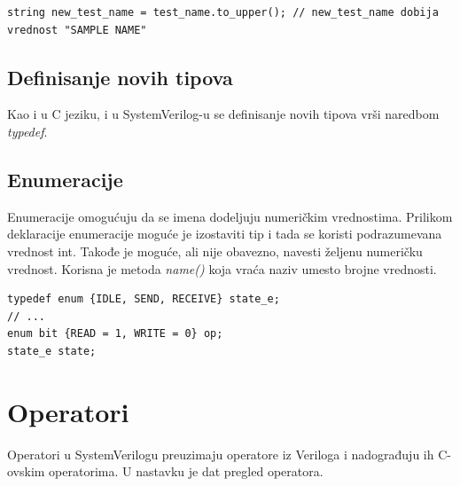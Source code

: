 \begin{lstlisting}
string new_test_name = test_name.to_upper(); // new_test_name dobija vrednost "SAMPLE NAME"
\end{lstlisting}


\subsection{Definisanje novih tipova}

Kao i u C jeziku, i u SystemVerilog-u se definisanje novih tipova vrši naredbom
\emph{typedef}.


\subsection{Enumeracije}

Enumeracije omogućuju da se imena dodeljuju numeričkim vrednostima. Prilikom
deklaracije enumeracije moguće je izostaviti tip i tada se koristi podrazumevana
vrednost int. Takođe je moguće, ali nije obavezno, navesti željenu numeričku
vrednost. Korisna je metoda \emph{name()} koja vraća naziv umesto brojne
vrednosti.

\begin{lstlisting}
typedef enum {IDLE, SEND, RECEIVE} state_e;
// ...
enum bit {READ = 1, WRITE = 0} op;
state_e state;
\end{lstlisting}


\section{Operatori}

Operatori u SystemVerilogu preuzimaju operatore iz Veriloga i nadograđuju ih
C-ovskim operatorima.
U nastavku je dat pregled operatora.\\

